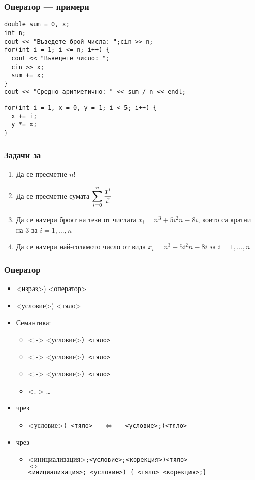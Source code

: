 \documentclass{beamer}
\newcommand{\expsum}{\displaystyle \sum_{i=0}^n \limits \frac{x^i}{i!}}
\begin{document}
\begin{frame}[fragile]
  \frametitle{Оператор  --- примери}

\begin{lstlisting}
double sum = 0, x;
int n;
cout << "Въведете брой числа: ";cin >> n;
for(int i = 1; i <= n; i++) {
  cout << "Въведете число: ";
  cin >> x;
  sum += x;
}
cout << "Средно аритметично: " << sum / n << endl;
\end{lstlisting}
\pause
\begin{lstlisting}
for(int i = 1, x = 0, y = 1; i < 5; i++) {
  x += i;
  y *= x;
}
\end{lstlisting}
\end{frame}

\begin{frame}
  \frametitle{Задачи за }

  \begin{enumerate}[<+->]
  \item Да се пресметне $n!$
  \item Да се пресметне сумата $\expsum$
  \item Да се намери броят на тези от числата $x_i = n^3 + 5i^2n -8i$, които са кратни на 3 за $i=1,\ldots,n$
  \item Да се намери най-голямото число от вида $x_i = n^3 + 5i^2n -8i$ за $i=1,\ldots,n$
  \end{enumerate}
\end{frame}

\begin{frame}
  \frametitle{Оператор }

  \begin{itemize}[<+->]
  \item {}<израз>\tta) <оператор>
  \item {}<условие>\tta) <тяло>
  \item Семантика:
    \begin{itemize}
    \item<.-> <условие>\tt) <тяло>
    \item<.-> <условие>\tt) <тяло>
    \item<.-> <условие>\tt) <тяло>
    \item<.-> \ldots
    \end{itemize}
  \item {} чрез 
    \begin{itemize}
    \item {}<условие>\tt) <тяло> $\quad\Leftrightarrow\quad$
      <условие>\tt{;)}<тяло>
    \end{itemize}
  \item {} чрез 
    \begin{itemize}
    \item {}<инициализация>\tt;<условие>\tt;<корекция>\tt)<тяло>\\
      $\Leftrightarrow$\\
      <инициализация>\tt; <условие>\tt{) \{ }<тяло> <корекция>\tt{;\}}
    \end{itemize}
  \end{itemize}
\end{frame}
\end{document}
